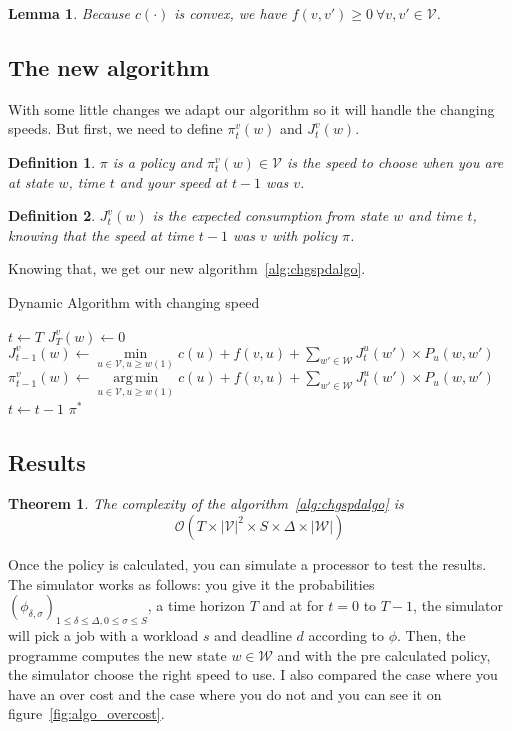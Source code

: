 \documentclass[
10pt, %
a4paper, %
oneside, %
headinclude,footinclude, %
BCOR5mm, %
]{scrartcl}
\DeclareMathOperator*{\argmin}{arg\,min}
\newcommand{\V}{\mathcal{V}}
\newcommand{\W}{\mathcal{W}}
\newtheorem{defi}{Definition}
\newtheorem{theo}{Theorem}
\newtheorem{lemma}{Lemma}
\begin{document}
\begin{lemma}
  Because $c(\cdot)$ is convex, we have $f(v,v')\geq0~\forall v,v'\in\V$.
\end{lemma}


\subsection{The new algorithm}
With some little changes we adapt our algorithm so it will handle
the changing speeds. But first, we need to define $\pi_t^v(w)$ and
$J_t^v(w)$.\\

\begin{defi}
  $\pi$ is a policy and $\pi_t^v(w)\in\V$ is the speed to choose when
  you are at state $w$, time $t$ and your speed at $t-1$ was $v$.\\
\end{defi}

\begin{defi}
  $J_t^v(w)$ is the expected consumption from state $w$ and time $t$,
  knowing that the speed at time $t-1$ was $v$ with policy $\pi$.
\end{defi}

Knowing that, we get our new algorithm~\ref{alg:chgspdalgo}.

\begin{algorithm}
  \caption{Dynamic Algorithm with changing speed}
  \label{alg:chgspdalgo}  
  \begin{algorithmic}
    \STATE $t\leftarrow T$
    \FORALL{$w\in\W,v\in\V$}
    \STATE $J_T^v(w)\leftarrow0$
    \ENDFOR
    \FORALL{$w\in\W,v\in\V$}
    \STATE $J_{t-1}^v(w)\leftarrow \min\limits_{u\in\V,u\geq w(1)}
    c(u)+f(v,u)+\sum\limits_{w'\in\W}J_t^u(w')\times P_u(w,w')$
    \STATE $\pi_{t-1}^v(w)\leftarrow \argmin\limits_{u\in\V,u\geq w(1)}
    c(u)+f(v,u)+\sum\limits_{w'\in\W}J_t^u(w')\times P_u(w,w')$    
    \ENDFOR
    \STATE $t\leftarrow t-1$
    \ENDWHILE
    \RETURN $\pi^*$
  \end{algorithmic}
\end{algorithm}

\subsection{Results}

\begin{theo}
  The complexity of the algorithm~\ref{alg:chgspdalgo} is
  \[
    \mathcal{O}(T\times|\V|^2\times S\times\Delta\times|\W|)    
  \]
\end{theo}
Once the policy is calculated, you can simulate a processor to
test the results.
The simulator works as follows: you give it the probabilities
$(\phi_{\delta,\sigma})_{1\leq\delta\leq \Delta,0\leq\sigma\leq S}$, a
time horizon $T$ and at for $t=0$ to $T-1$, the
simulator will pick a job with a workload $s$ and deadline $d$
according to $\phi$. Then, the programme computes the new state $w\in\W$
and with the pre calculated policy, the simulator choose the right
speed to use. I also compared the case where you have an over cost and
the case where you do not and you can see it on
figure~\ref{fig:algo_overcost}.\\
\end{document}
